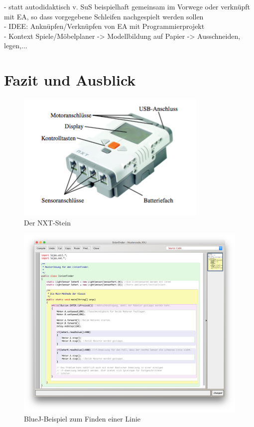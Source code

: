 \documentclass[paper=a4, DIV=13, BCOR=12mm, twoside=on, onecolumn=on, open = any, titlepage =on, parskip =half-, headsepline = on, footsepline = on, chapterprefix = on, sectionprefix = on, appendixprefix = off, fontsize = 11pt, numbers = noenddot, abstract = off]{scrreprt}
\begin{document}
- statt autodidaktisch v. SuS beispielhaft gemeinsam im Vorwege oder verknüpft mit EA, so dass vorgegebene Schleifen nachgespielt werden sollen\\
- IDEE: Anknüpfen/Verknüpfen von EA mit Programmierprojekt\\
- Kontext Spiele/Möbelplaner -> Modellbildung auf Papier -> Ausschneiden, legen,...


\newpage
\chapter{Fazit und Ausblick}
\onehalfspacing

\begin{figure}[htb]
\centering
\includegraphics[scale=0.7]{images/NXT-Stein.png} 
\caption[Der NXT-Stein]{Der NXT-Stein \cite[S. 42]{berns:10}}
\label{fig:NXT Stein}
\end{figure}

\begin{figure}[htb]
\centering
\includegraphics[width=\textwidth]{images/linienfinder_bluej.png} 
\caption{BlueJ-Beispiel zum Finden einer Linie}
\label{fig:Bsp BlueJ Linienfinder}
\end{figure}
\end{document}
